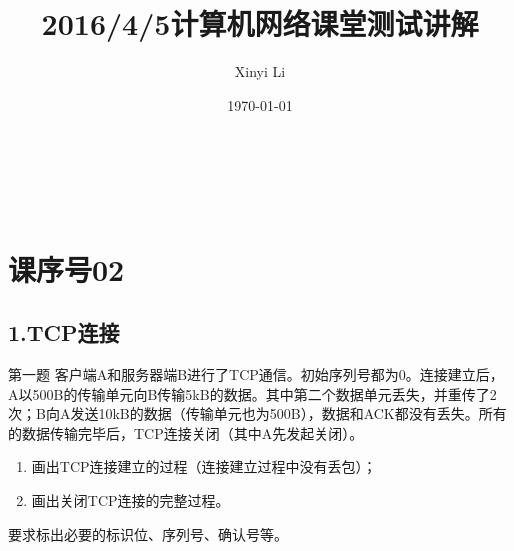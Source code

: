 \documentclass[handout]{beamer}
\title[课堂测验题解]{2016/4/5计算机网络课堂测试讲解}
\author[\faEnvelope{} \href{mailto:cippusmcm@163.com}{\textit{i@xyli.me}}]{Xinyi Li}
\institute[]{\faChain{} \url{https://www.yangzhou301.com/2016/04/07/471457613/}}
\date{\today}
\begin{document}
	\linespread{1}
	{
		\begin{frame}[plain]
			\vspace{13em}
			\begin{titleBox}
				{\centering{\LARGE \inserttitle}
				}\\
				\insertinstitute \\ \faCalendarCheckO{ }\insertdate
			\end{titleBox}
		\end{frame}
	}
	\section{课序号02}
	\subsection{1.TCP连接}
	\begin{frame}{第一题}
		客户端A和服务器端B进行了TCP通信。初始序列号都为0。连接建立后，A以500B的传输单元向B传输5kB的数据。其中第二个数据单元丢失，并重传了2次；B向A发送10kB的数据（传输单元也为500B），数据和ACK都没有丢失。所有的数据传输完毕后，TCP连接关闭（其中A先发起关闭）。
		\begin{enumerate}
			\item 画出TCP连接建立的过程（连接建立过程中没有丢包）；
			\item 	画出关闭TCP连接的完整过程。
		\end{enumerate}
		要求标出必要的标识位、序列号、确认号等。
	\end{frame}
	
\end{document}
